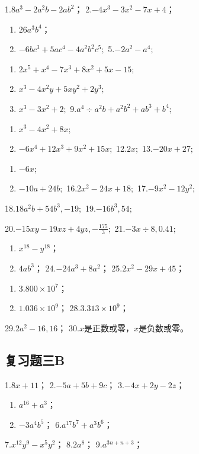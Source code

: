 1.\(8a^{3} - 2a^{2}b - 2ab^{2}\)； 2.\(-4x^{3} - 3x^{2} - 7x + 4\)；
\begin{enumerate}[start=3]
\item
  \(26a^{3}b^{4}\)；
\item
  \(-6bc^{3} + 5ac^{4} - 4a^{2}b^{2}c^{5};\) 5.\(-2a^{2} - a^{4};\)
\end{enumerate}

\begin{enumerate}[start=6]
\item
  \(2x^{5} + x^{4} - 7x^{3} + 8x^{2} + 5x - 15;\)
\item
  \(x^{3} - 4x^{2}y + 5xy^{2} + 2y^{3};\)
\item
  \(x^{3} - 3x^{2} + 2;\) 9.\(a^4 \div a^2 b + a^2 b^2 + ab^3 + b^4;\)
\end{enumerate}
\begin{enumerate}[start=10]
\item
  \(x^3 - 4x^2 + 8x;\)
\item
  \(-6x^{4} + 12x^{3} + 9x^{2} + 15x;\) 12.\(2x;\) 13.\(-20x + 27;\)
\end{enumerate}
\begin{enumerate}[start=14]
\item
  \(-6x;\)
\item
  \(-10a + 24b;\) 16.\(2x^{2} - 24x + 18;\) 17.\(-9x^{2} - 12y^{2};\)
\end{enumerate}

18.\(18a^{2}b + 54b^{3}, - 19;\) 19.\(-16b^{3},54;\)

20.\(-15xy - 19xz + 4yz, -\frac{175}{3};\) 21.\(-3x \div 8, 0.41;\)
\begin{enumerate}[start=22]
\item
  \(x^{18} - y^{18}\)；
\item
  \(4ab^{3}\)； 24.\(-24a^{3} + 8a^{2}\)； 25.\(2x^{2} - 29x + 45\)；
\end{enumerate}
\begin{enumerate}[start=26]
\item
  \(3.800 \times 10^{7}\)；
\item
  \(1.036 \times 10^{9}\)； 28.\(3.313 \times 10^{9}\)；
\end{enumerate}
29.\(2a^{2} - 16, 16\)； 30.\(x\)是正数或零，\(x\)是负数或零。

\subsection{复习题三B}

1.\(8x + 11\)； 2.\(-5a + 5b + 9c\)； 3.\(-4x + 2y - 2z\)；
\begin{enumerate}[start=4]
\item
  \(a^{16} + a^3\)；
\item
  \(-3a^{4}b^{5}\)； 6.\(a^{17}b^{7} + a^{3}b^{6}\)；
\end{enumerate}
7.\(x^{12}y^{9} - x^{5}y^{2}\)； 8.\(2a^{8}\)； 9.\(a^{3n + n + 3}\)；

